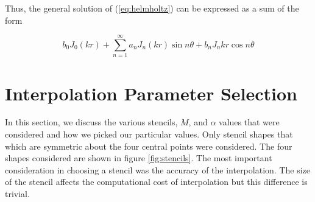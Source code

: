 \documentclass{report}
\begin{document}
Thus, the general solution of (\ref{eq:helmholtz}) can be expressed as a sum of the form

\begin{equation}
  \label{eq:helmholtz_gen_soln}
  b_{0} J_{0}(kr) + \sum_{n = 1}^{\infty}{a_{n} J_n(kr) \sin{n \theta} + b_{n} J_n{kr} \cos{n \theta}}
\end{equation}

\chapter{Interpolation Parameter Selection}
\label{sec:params}
In this section, we discuss the various stencils, $M$, and $\alpha$ values that were considered and how we picked our particular values.
Only stencil shapes that which are symmetric about the four central points were considered. The four shapes considered are shown in figure \ref{fig:stencils}. The most important consideration in choosing a stencil was the accuracy of the interpolation. The size of the stencil affects the computational cost of interpolation but this difference is trivial.
\end{document}
